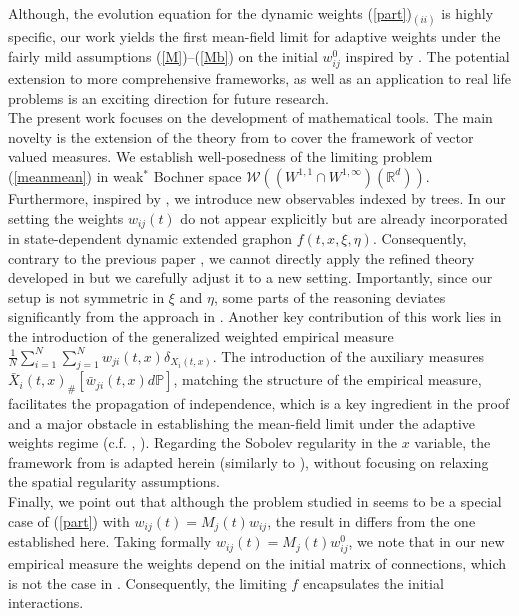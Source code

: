 \documentclass[10pt]{article}
\newcommand{\R}{\mathbb{R}}
\newcommand{\sn}{\frac{1}{N}\sum_{i=1}^N}
\newcommand{\xb}{\bar{X}}
\newcommand{\p}{\mathbb{P}}
\newcommand{\wji}{w_{ji}}
\newcommand{\wjib}{\bar{w}_{ji}}
\newcommand{\W}{\mathcal{W}}
\begin{document}
Although, the evolution equation for the dynamic weights (\ref{part})$_{(ii)}$ is highly specific, our work yields the first mean-field limit for adaptive weights under the fairly mild assumptions (\ref{M})–(\ref{Mb}) on the initial $w_{ij}^0$ inspired by \cite{JPS2025}. The potential extension to more comprehensive frameworks, as well as an application to real life problems is  an exciting direction for future research.\\
The present work focuses on the development of mathematical tools. The main novelty is the extension of the theory from \cite{JPS2025} to cover the framework of vector valued measures. We establish well-posedness of the limiting problem (\ref{meanmean}) in weak$^*$
 Bochner space $\W((W^{1,1}\cap W^{1,\infty})(\R^d))$.  Furthermore, inspired by \cite{JPS2025}, we introduce new observables indexed by trees. In our setting the weights $w_{ij}(t)$ do not appear explicitly but are already incorporated in state-dependent dynamic extended graphon $f(t,x,\xi,\eta)$. Consequently, contrary to the previous paper \cite{nasza}, we cannot directly apply the refined theory developed in \cite{JPS2025} but we carefully adjust it to a new setting. Importantly, since our setup is not symmetric in $\xi$ and $\eta$, some parts of the reasoning deviates significantly from the approach in \cite{JPS2025}. Another key contribution of this work lies in the introduction of the generalized weighted empirical measure $\sn \sum_{j=1}^N \wji(t,x)\delta_{X_i(t,x)}$. The introduction of the auxiliary measures $\xb_i(t,x)_{\#}[\wjib(t,x)d\p]$, matching the structure of the empirical measure, facilitates the propagation of independence, which is a key ingredient in the proof and a major obstacle in establishing the mean-field limit under the adaptive weights regime
(c.f. \cite{A2026}, \cite{Zhou}). Regarding the Sobolev regularity in the $x$ variable, the framework from \cite{JPS2025} is adapted herein (similarly to \cite{nasza}), without focusing on relaxing the spatial regularity assumptions.\\
Finally, we point out that although  the problem studied in \cite{nasza} seems to be a special case of (\ref{part}) with $w_{ij}(t) = M_j(t)w_{ij}$, the result in \cite{nasza} differs from the one established here. Taking formally  $w_{ij}(t) = M_j(t)w^0_{ij}$, we note that in our new empirical measure the weights depend on the initial matrix of connections, which is not the case in \cite{nasza}. Consequently, the limiting $f$ encapsulates the initial interactions.  
\end{document}
